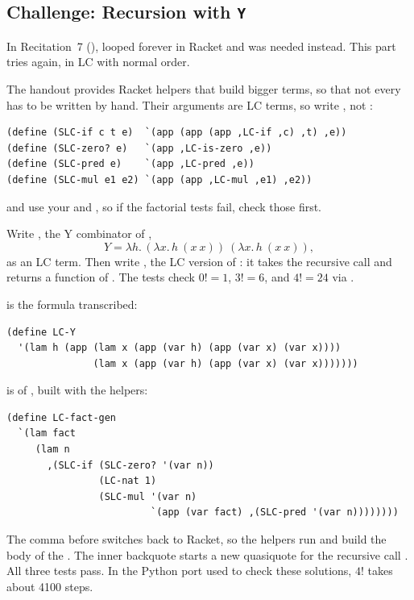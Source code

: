 \subsection{Challenge: Recursion with \texttt{Y}}

In Recitation~7 (),  looped forever in Racket and  was needed instead. This part tries  again, in LC with normal order.

The handout provides Racket helpers that build bigger terms, so that not every  has to be written by hand. Their arguments are LC terms, so write , not :
\begin{lstlisting}
(define (SLC-if c t e)  `(app (app (app ,LC-if ,c) ,t) ,e))
(define (SLC-zero? e)   `(app ,LC-is-zero ,e))
(define (SLC-pred e)    `(app ,LC-pred ,e))
(define (SLC-mul e1 e2) `(app (app ,LC-mul ,e1) ,e2))
\end{lstlisting}
 and  use your  and , so if the factorial tests fail, check those first.

\begin{exercise}
Write , the Y combinator of ,
\[
Y = \lambda h.\, (\lambda x.\, h\ (x\ x))\ (\lambda x.\, h\ (x\ x)),
\]
as an LC term. Then write , the LC version of : it takes the recursive call  and returns a function of . The tests check $0! = 1$, $3! = 6$, and $4! = 24$ via .
\end{exercise}
\begin{solution}
 is the formula transcribed:
\begin{lstlisting}
(define LC-Y
  '(lam h (app (lam x (app (var h) (app (var x) (var x))))
               (lam x (app (var h) (app (var x) (var x)))))))
\end{lstlisting}
 is  of , built with the helpers:
\begin{lstlisting}
(define LC-fact-gen
  `(lam fact
     (lam n
       ,(SLC-if (SLC-zero? '(var n))
                (LC-nat 1)
                (SLC-mul '(var n)
                         `(app (var fact) ,(SLC-pred '(var n))))))))
\end{lstlisting}
The comma before  switches back to Racket, so the helpers run and build the body of the . The inner backquote starts a new quasiquote for the recursive call . All three tests pass. In the Python port used to check these solutions, $4!$ takes about 4100 steps.
\end{solution}

